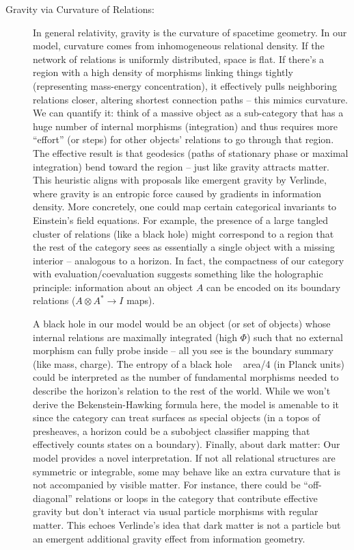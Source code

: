 \documentclass{article}
\begin{document}
\begin{description}
\item[Gravity via Curvature of Relations:] In general relativity, gravity is the curvature of spacetime geometry. In our model, curvature comes from inhomogeneous relational density. If the network of relations is uniformly distributed, space is flat. If there’s a region with a high density of morphisms linking things tightly (representing mass-energy concentration), it effectively pulls neighboring relations closer, altering shortest connection paths – this mimics curvature. We can quantify it: think of a massive object as a sub-category that has a huge number of internal morphisms (integration) and thus requires more “effort” (or steps) for other objects’ relations to go through that region. The effective result is that geodesics (paths of stationary phase or maximal integration) bend toward the region – just like gravity attracts matter. This heuristic aligns with proposals like emergent gravity by Verlinde, where gravity is an entropic force caused by gradients in information density\cite{verlinde2011}. More concretely, one could map certain categorical invariants to Einstein’s field equations. For example, the presence of a large tangled cluster of relations (like a black hole) might correspond to a region that the rest of the category sees as essentially a single object with a missing interior – analogous to a horizon. In fact, the compactness of our category with evaluation/coevaluation suggests something like the holographic principle: information about an object $A$ can be encoded on its boundary relations ($A \otimes A^* \to I$ maps).

A black hole in our model would be an object (or set of objects) whose internal relations are maximally integrated (high $\Phi$) such that no external morphism can fully probe inside – all you see is the boundary summary (like mass, charge). The entropy of a black hole ~ area/4 (in Planck units) could be interpreted as the number of fundamental morphisms needed to describe the horizon’s relation to the rest of the world\cite{bekenstein1973}. While we won’t derive the Bekenstein-Hawking formula here, the model is amenable to it since the category can treat surfaces as special objects (in a topos of presheaves, a horizon could be a subobject classifier mapping that effectively counts states on a boundary). Finally, about dark matter: Our model provides a novel interpretation. If not all relational structures are symmetric or integrable, some may behave like an extra curvature that is not accompanied by visible matter. For instance, there could be “off-diagonal” relations or loops in the category that contribute effective gravity but don’t interact via usual particle morphisms with regular matter. This echoes Verlinde’s idea that dark matter is not a particle but an emergent additional gravity effect from information geometry\cite{verlinde2016}.


\end{description}
\end{document}
